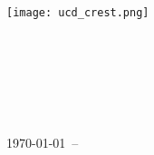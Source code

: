 \begin{titlepage}
    \begin{addmargin}[-1cm]{-3cm}
    \begin{center}
        \large

        \hfill

        \vfill

        \begingroup
            \color{CTtitle}\spacedallcaps{\myTitle} \\ \bigskip
        \endgroup

        \spacedlowsmallcaps{\myName}

        \vfill

        \texttt{[image: ucd\_crest.png]} \\ \medskip

        \mySubtitle \\ \medskip
        \myDegree \\
        \myDepartment \\
        \myFaculty \\
        \myUni \\ \bigskip

        \today\ -- \myVersion

        \vfill

    \end{center}
  \end{addmargin}
\end{titlepage}
